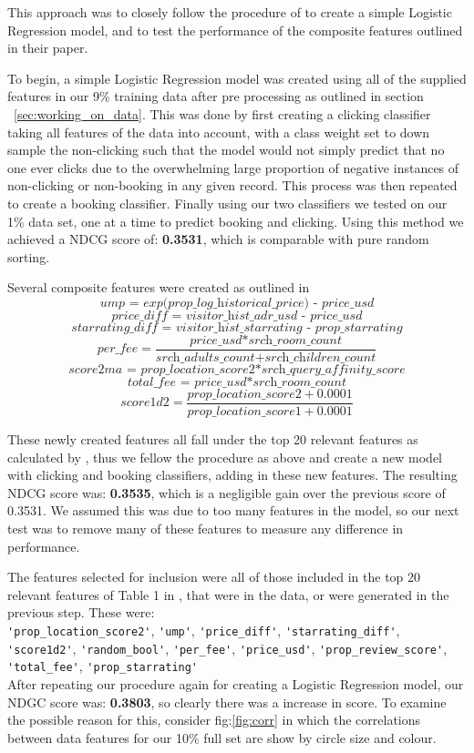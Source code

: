 \documentclass{llncs}
\begin{document}
This approach was to closely follow the procedure of \cite{DBLP:journals/corr/LiuXZYPLSW13} to create a simple Logistic Regression model, and to test the performance of the composite features outlined in their paper.

To begin, a simple Logistic Regression model was created using all of the supplied features in our 9\% training data after pre processing as outlined in section ~\ref{sec:working_on_data}. This was done by first creating a clicking classifier taking all features of the data into account, with a class weight set to down sample the non-clicking such that the model would not simply predict that no one ever clicks due to the overwhelming large proportion of negative instances of non-clicking or non-booking in any given record. This process was then repeated to create a booking classifier.
Finally using our two classifiers we tested on our 1\% data set, one at a time to predict booking and clicking. Using this method we achieved a NDCG score of: \textbf{0.3531}, which is comparable with pure random sorting.

Several composite features were created as outlined in \cite{DBLP:journals/corr/LiuXZYPLSW13}
\[\textit{ump = exp(prop\_ log\_ historical\_ price) - price\_ usd}\]
\[\textit{price\_ diff = visitor\_ hist\_ adr\_ usd - price\_ usd}\]
\[\textit{starrating\_ diff = visitor\_ hist\_ starrating - prop\_ starrating}\]
\[\textit{per\_ fee} = \frac{\textit{price\_ usd*srch\_ room\_ count}}{\textit{srch\_ adults\_ count+srch\_ children\_ count}}\]
\[\textit{score2ma = prop\_ location\_ score2*srch\_ query\_ affinity\_ score}\]
\[\textit{total\_ fee = price\_ usd*srch\_ room\_ count}\]
\[\textit{score1d2} = \frac{\textit{prop\_ location\_ score2} + 0.0001}{\textit{prop\_ location\_ score1} + 0.0001}\]

These newly created features all fall under the top 20 relevant features as calculated by \cite{DBLP:journals/corr/LiuXZYPLSW13}, thus we fellow the procedure as above and create a new model with clicking and booking classifiers, adding in these new features. The resulting NDCG score was: \textbf{0.3535}, which is a negligible gain over the previous score of 0.3531. We assumed this was due to too many features in the model, so our next test was to remove many of these features to measure any difference in performance.

 The features selected for inclusion were all of those included in the top 20 relevant features of Table 1 in \cite{DBLP:journals/corr/LiuXZYPLSW13}, that were in the data, or were generated in the previous step. These were:\\ \verb!'prop_location_score2'!, \verb!'ump'!, \verb!'price_diff'!, \verb!'starrating_diff'!, \verb!'score1d2'!, \verb!'random_bool'!, \verb!'per_fee'!, \verb!'price_usd'!, \verb!'prop_review_score'!, \verb!'total_fee'!, \verb!'prop_starrating'!
\\
After repeating our procedure again for creating a Logistic Regression model, our NDGC score was: \textbf{0.3803}, so clearly there was a increase in score. To examine the possible reason for this, consider fig:\ref{fig:corr} in which the correlations between data features for our 10\% full set are show by circle size and colour.
\end{document}

